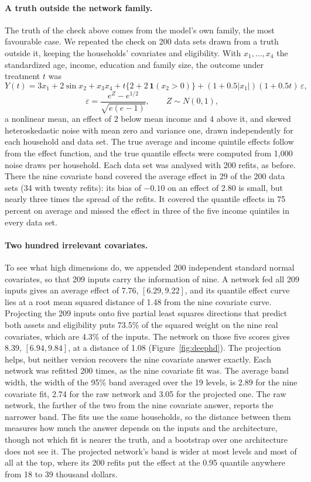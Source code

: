\paragraph{A truth outside the network family.} The truth of the check above comes from the model's own family, the most favourable case. We repeated the check on 200 data sets drawn from a truth outside it, keeping the households' covariates and eligibility. With $x_1, \ldots, x_4$ the standardized age, income, education and family size, the outcome under treatment $t$ was
\[
Y(t) = 3x_1 + 2\sin x_2 + x_3x_4 + t\{2 + 2\,\mathbf{1}(x_2 > 0)\} + (1 + 0.5|x_1|)(1 + 0.5t)\,\varepsilon,
\]
\[
\varepsilon = \frac{e^{Z} - e^{1/2}}{\sqrt{e(e - 1)}}, \qquad Z \sim N(0, 1),
\]
a nonlinear mean, an effect of 2 below mean income and 4 above it, and skewed heteroskedastic noise with mean zero and variance one, drawn independently for each household and data set. The true average and income quintile effects follow from the effect function, and the true quantile effects were computed from 1,000 noise draws per household. Each data set was analysed with 200 refits, as before. There the nine covariate band covered the average effect in 29 of the 200 data sets (34 with twenty refits): its bias of $-0.10$ on an effect of 2.80 is small, but nearly three times the spread of the refits. It covered the quantile effects in 75 percent on average and missed the effect in three of the five income quintiles in every data set.

\paragraph{Two hundred irrelevant covariates.} To see what high dimensions do, we appended 200 independent standard normal covariates, so that 209 inputs carry the information of nine. A network fed all 209 inputs gives an average effect of 7.76, $[6.29, 9.22]$, and its quantile effect curve lies at a root mean squared distance of 1.48 from the nine covariate curve. Projecting the 209 inputs onto five partial least squares directions that predict both assets and eligibility puts 73.5\% of the squared weight on the nine real covariates, which are 4.3\% of the inputs. The network on those five scores gives 8.39, $[6.94, 9.84]$, at a distance of 1.08 (Figure~\ref{fig:deephd}). The projection helps, but neither version recovers the nine covariate answer exactly. Each network was refitted 200 times, as the nine covariate fit was. The average band width, the width of the 95\% band averaged over the 19 levels, is 2.89 for the nine covariate fit, 2.74 for the raw network and 3.05 for the projected one. The raw network, the farther of the two from the nine covariate answer, reports the narrower band. The fits use the same households, so the distance between them measures how much the answer depends on the inputs and the architecture, though not which fit is nearer the truth, and a bootstrap over one architecture does not see it. The projected network's band is wider at most levels and most of all at the top, where its 200 refits put the effect at the 0.95 quantile anywhere from 18 to 39 thousand dollars. 


